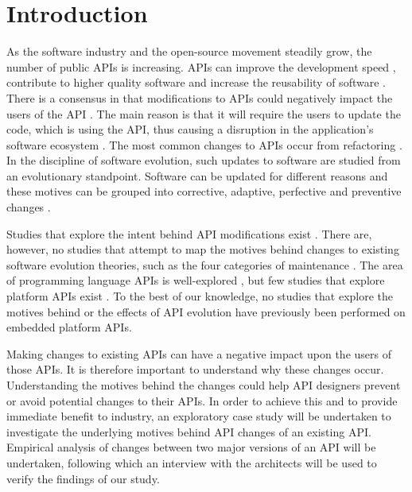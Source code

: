\documentclass{sig-alternate}
\begin{document}



\section{Introduction} \label{introduction}
As the software industry and the open-source movement steadily grow, the number of public APIs is increasing. APIs can improve the development speed \cite{stylos2006comparing}, contribute to higher quality software \cite{stylos2006comparing} and increase the reusability of software \cite{afonso2012evaluating}. There is a consensus in that modifications to APIs could negatively impact the users of the API \cite{google_talk} \cite{mcdonnell2013empirical} \cite{robbes2012developers} \cite{henning2007api}. The main reason is that it will require the users to update the code, which is using the API, thus causing a disruption in the application's software ecosystem \cite{messerschmitt2005software}. The most common changes to APIs occur from refactoring \cite{dig2005role} \cite{xing2006refactoring}. 
In the discipline of software evolution, such updates to software are studied from an evolutionary standpoint. Software can be updated for different reasons and these motives can be grouped into corrective, adaptive, perfective and preventive changes \cite{lientz1980software}. 

Studies that explore the intent behind API modifications exist \cite{hou2011exploring}. There are, however, no studies that attempt to map the motives behind changes to existing software evolution theories, such as the four categories of maintenance \cite{lientz1980software}. The area of programming language APIs is well-explored \cite{hou2011exploring} \cite{shi2011empirical}, but few studies that explore platform APIs exist \cite{robbes2012developers}. To the best of our knowledge, no studies that explore the motives behind or the effects of API evolution have previously been performed on embedded platform APIs. 

Making changes to existing APIs can have a negative impact upon the users of those APIs. It is therefore important to understand why these changes occur. Understanding the motives behind the changes could help API designers prevent or avoid potential changes to their APIs. In order to achieve this and to provide immediate benefit to industry, an exploratory case study will be undertaken to investigate the underlying motives behind API changes of an existing API. Empirical analysis of changes between two major versions of an API will be undertaken, following which an interview with the architects will be used to verify the findings of our study. 
\end{document}
